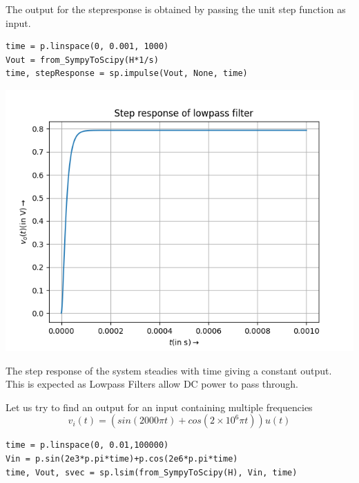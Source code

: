 \documentclass[12pt, a4paper]{report}
\begin{document}
The output for the stepresponse is obtained by passing the unit step function as input. 
\begin{verbatim}
time = p.linspace(0, 0.001, 1000)
Vout = from_SympyToScipy(H*1/s)
time, stepResponse = sp.impulse(Vout, None, time)
\end{verbatim}

\begin{center}
	\includegraphics[scale=0.72]{Figure_2.png} 
	\label{fig:rawdata}
\end{center}

The step response of the system steadies with time giving a constant output. This is expected as Lowpass Filters allow DC power to pass through.

Let us try to find an output for an input containing multiple frequencies 
\begin{equation}
v_i(t) = ( sin(2000\pi t) + cos(2 \times 10^6 \pi t))u(t)
\end{equation}

\begin{verbatim}
time = p.linspace(0, 0.01,100000)
Vin = p.sin(2e3*p.pi*time)+p.cos(2e6*p.pi*time)
time, Vout, svec = sp.lsim(from_SympyToScipy(H), Vin, time)
\end{verbatim}
\end{document}
